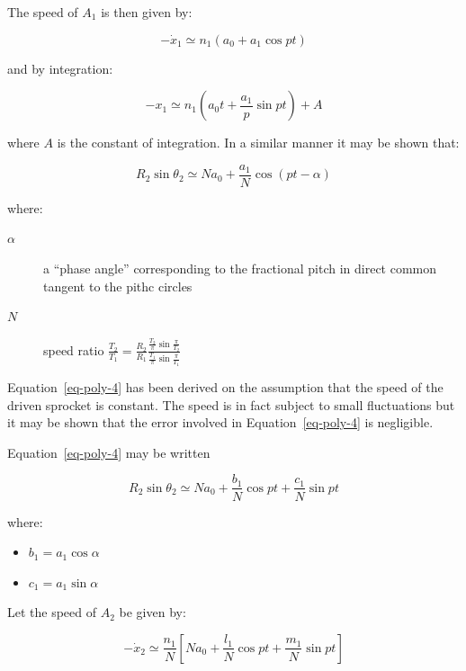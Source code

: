 The speed of $A_1$ is then given by:

\begin{equation}
  -\dot{x}_1 \simeq n_1\left(a_0+ a_1\cos pt\right)
\end{equation}

and by integration:

\begin{equation}
  -x_1 \simeq n_1\left(a_0t+ \frac{a_1}{p}\sin pt\right) + A
  \label{eq-poly-3}
\end{equation}

where $A$ is the constant of integration. In a similar manner it may be shown that:

\begin{equation}
  R_2\sin\theta_2 \simeq Na_0+\frac{a_1}{N}\cos (pt-\alpha)
  \label{eq-poly-4}
\end{equation}

where:

\begin{description}
\item[$\alpha$] a ``phase angle'' corresponding to the fractional pitch in direct common tangent to the pithc circles
\item[$N$] speed ratio $\frac{T_2}{T_1}=\frac{R_2}{R_1}\frac{\frac{T_2}{\pi}\sin\frac{\pi}{T_2}}{\frac{T_1}{\pi}\sin\frac{\pi}{T_1}}$
\end{description}

Equation~\ref{eq-poly-4} has been derived on the assumption that the speed of the driven sprocket is constant. The speed is in fact subject to small fluctuations but it may be shown that the error involved in Equation~\ref{eq-poly-4} is negligible.

Equation~\ref{eq-poly-4} may be written

\begin{equation}
  R_2\sin\theta_2\simeq Na_0+\frac{b_1}{N}\cos pt + \frac{c_1}{N}\sin pt
  \label{eq-poly-5}
\end{equation}

where:

\begin{itemize}
\item $b_1=a_1\cos\alpha$
\item $c_1=a_1\sin\alpha$
\end{itemize}

Let the speed of $A_2$ be given by:

\begin{equation}
  -\dot{x}_2 \simeq \frac{n_1}{N}\left[Na_0+\frac{l_1}{N}\cos pt +\frac{m_1}{N} \sin pt\right]
  \label{eq-poly-6}
\end{equation}

